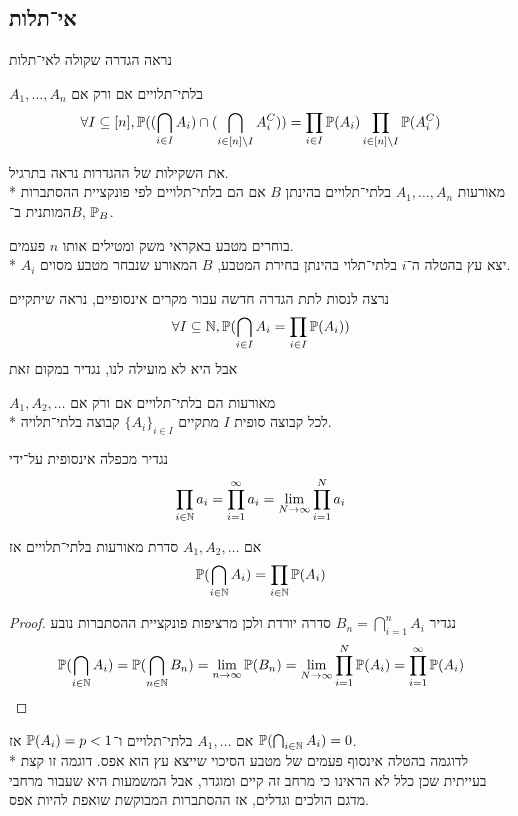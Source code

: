 \subsection{אי־תלות}
נראה הגדרה שקולה לאי־תלות
\begin{definition}
	$A_1, \dots, A_n$ בלתי־תלויים אם ורק אם
	\[
		\forall I \subseteq [n], \mathbb{P}((\bigcap_{i \in I} A_i) \cap (\bigcap_{i \in [n] \setminus I} A_i^C))
		= \prod_{i \in I} \mathbb{P}(A_i) \prod_{i \in [n] \setminus I} \mathbb{P}(A_i^C)
	\]
\end{definition}
את השקילות של ההגדרות נראה בתרגיל. \\*
מאורעות $A_1, \dots, A_n$ בלתי־תלויים בהינתן $B$ אם הם בלתי־תלויים לפי פונקציית ההסתברות המותנית ב־$B$, $\mathbb{P}_B$.
\begin{example}
	בוחרים מטבע באקראי משק ומטילים אותו $n$ פעמים. \\*
	$A_i$ יצא עץ בהטלה ה־$i$ בלתי־תלוי בהינתן בחירת המטבע, $B$ המאורע שנבחר מטבע מסוים.
\end{example}
נרצה לנסות לתת הגדרה חדשה עבור מקרים אינסופיים, נראה שיתקיים
\[
	\forall I \subseteq \mathbb{N}, \mathbb{P}(\bigcap_{i \in I} A_i = \prod_{i \in I} \mathbb{P}(A_i))
\]
אבל היא לא מועילה לנו, נגדיר במקום זאת
\begin{definition}
	$A_1, A_2, \dots$ מאורעות הם בלתי־תלויים אם ורק אם \\*
	לכל קבוצה סופית $I$ מתקיים ${\{A_i\}}_{i \in I}$ קבוצה בלתי־תלויה.
\end{definition}
\begin{remark}
	נגדיר מכפלה אינסופית על־ידי
	\[
		\prod_{i \in \mathbb{N}} a_i
		= \prod_{i = 1}^\infty a_i
		= \lim_{N \to \infty} \prod_{i = 1}^N a_i
	\]
\end{remark}
\begin{proposition}
	אם $A_1, A_2, \dots$ סדרת מאורעות בלתי־תלויים אז
	\[
		\mathbb{P}(\bigcap_{i \in \mathbb{N}} A_i) = \prod_{i \in \mathbb{N}} \mathbb{P}(A_i)
	\]
\end{proposition}
\begin{proof}
	נגדיר $B_n = \bigcap_{i = 1}^n A_i$ סדרה יורדת ולכן מרציפות פונקציית ההסתברות נובע
	\[
		\mathbb{P}(\bigcap_{i \in \mathbb{N}} A_i)
		= \mathbb{P}(\bigcap_{n \in \mathbb{N}} B_n)
		= \lim_{n \to \infty} \mathbb{P}(B_n)
		= \lim_{N \to \infty} \prod_{i = 1}^N \mathbb{P}(A_i)
		= \prod_{i = 1}^\infty \mathbb{P}(A_i)
	\]
\end{proof}
\begin{example}
	אם $A_1, \dots$ בלתי־תלויים ו־$\mathbb{P}(A_i) = p < 1$ אז $\mathbb{P}(\bigcap_{i \in \mathbb{N}} A_i) = 0$. \\*
	לדוגמה בהטלה אינסוף פעמים של מטבע הסיכוי שייצא עץ הוא אפס.
	דוגמה זו קצת בעייתית שכן כלל לא הראינו כי מרחב זה קיים ומוגדר, אבל המשמעות היא שעבור מרחבי מדגם הולכים וגדלים, אז ההסתברות המבוקשת שואפת להיות אפס.
\end{example}

